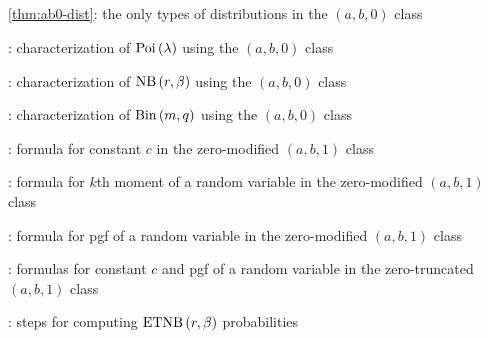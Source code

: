 \subsection*{}
\item \cref{thm:ab0-dist}: the only types of distributions in the \((a,b,0)\) class
\item {}: characterization of \(\operatorname{Poi}\left(\lambda\right)\) using the \((a,b,0)\) class
\item {}: characterization of \(\operatorname{NB}\left(r,\beta\right)\) using the \((a,b,0)\) class
\item {}: characterization of \(\operatorname{Bin}\left(m,q\right)\) using the \((a,b,0)\) class
\item {}: formula for constant \(c\) in the zero-modified \((a,b,1)\) class
\item {}: formula for \(k\)th moment of a random variable in the zero-modified \((a,b,1)\) class
\item {}: formula for pgf of a random variable in the zero-modified \((a,b,1)\) class
\item {}: formulas for constant \(c\) and pgf of a random variable in the zero-truncated \((a,b,1)\) class
\item {}: steps for computing \(\operatorname{ETNB}\left(r,\beta\right)\) probabilities
